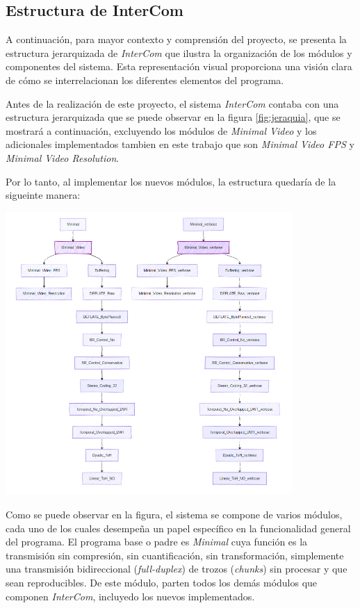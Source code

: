 \subsection{Estructura de InterCom}

A continuación, para mayor contexto y comprensión del proyecto, se presenta la estructura jerarquizada de \textit{InterCom} que ilustra la organización de los módulos y componentes del sistema. Esta representación visual proporciona una visión clara de cómo se interrelacionan los diferentes elementos del programa.
\vspace{\baselineskip}

Antes de la realización de este proyecto, el sistema \textit{InterCom} contaba con una estructura jerarquizada que se puede observar en la figura \ref{fig:jeraquia}, que se mostrará a continuación, excluyendo los módulos de \textit{Minimal Video} y los adicionales implementados tambien en este trabajo que son \textit{Minimal Video FPS} y \textit{Minimal Video Resolution}. 

\vspace{\baselineskip}
Por lo tanto, al implementar los nuevos módulos, la estructura quedaría de la sigueinte manera:

\begin{center}
	\includegraphics[width = 0.82\textwidth]{images/esquema_jerarquico.png}
	\label{fig:jeraquia}
\end{center}

\vspace{\baselineskip}
Como se puede observar en la figura, el sistema se compone de varios módulos, cada uno de los cuales desempeña un papel específico en la funcionalidad general del programa. El programa base o padre es \textit{Minimal} cuya función es la transmisión sin compresión, sin cuantificación, sin transformación, simplemente una transmisión bidireccional (\textit{full-duplex}) de trozos (\textit{chunks}) sin procesar y que sean reproducibles. De este módulo, parten todos los demás módulos que componen \textit{InterCom}, incluyedo los nuevos implementados. 


